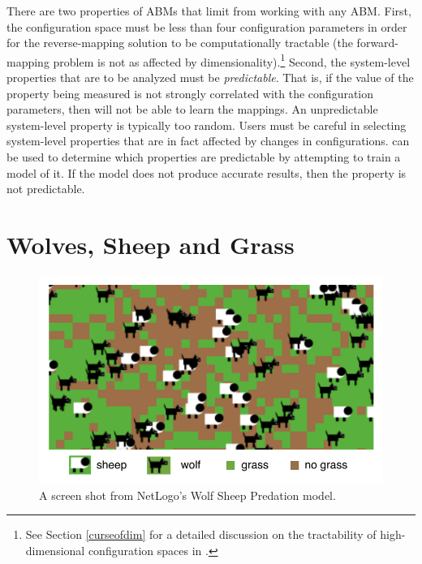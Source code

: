 There are two properties of ABMs that limit \fw from working with any ABM.
First, the configuration space must be less than four configuration parameters in order for the reverse-mapping solution to be computationally tractable (the forward-mapping problem is not as affected by dimensionality).\footnote{See Section \ref{curseofdim} for a detailed discussion on the tractability of high-dimensional configuration spaces in \fw.}
Second, the system-level properties that are to be analyzed must be \textit{predictable}.
That is, if the value of the property being measured is not strongly correlated with the configuration parameters, then \fw will not be able to learn the mappings.
An unpredictable system-level property is typically too random.
Users must be careful in selecting system-level properties that are in fact affected by changes in configurations.
\fw can be used to determine which properties are predictable by attempting to train a model of it.
If the model does not produce accurate results, then the property is not predictable.

\section{Wolves, Sheep and Grass}

\begin{figure}[ht]
\centering
\includegraphics{images/intro_wolfsheep.pdf}
\caption{A screen shot from NetLogo's Wolf Sheep Predation model.}
\label{fig:wolfsheep}
\end{figure}




